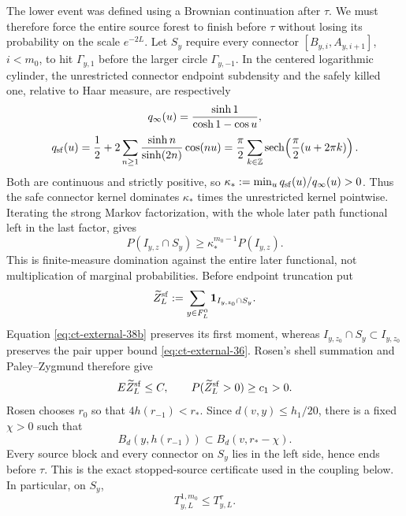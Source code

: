 The lower event was defined using a Brownian continuation after $\tau$.
We must therefore force the entire source forest to finish before $\tau$
without losing its probability on the scale $e^{-2L}$.  Let $S_y$ require every connector
$[B_{y,i},A_{y,i+1}]$, $i<m_0$, to hit $\Gamma_{y,1}$ before the
larger circle $\Gamma_{y,-1}$.  In the centered logarithmic cylinder,
the unrestricted connector endpoint subdensity and the safely killed
one, relative to Haar measure, are respectively
\[
q_\infty(u)={\sinh1\over\cosh1-\cos u},
\]
\begin{equation}
q_{\rm sf}(u)=\frac12+2\sum_{n\ge1}{\sinh n\over\sinh(2n)}\cos(nu)
 =\frac\pi2\sum_{k\in\mathbb Z}
       \operatorname {sech}\!\left({\pi\over2}(u+2\pi k)\right).\label{eq:ct-external-38a}
\end{equation}
Both are continuous and strictly positive, so
$\kappa_*:=\min_uq_{\rm sf}(u)/q_\infty(u)>0$.  Thus the safe
connector kernel dominates $\kappa_*$ times the unrestricted kernel
pointwise.  Iterating the strong Markov factorization, with the whole
later path functional left in the last factor, gives
\begin{equation}
P(I_{y,z}\cap S_y)\ge\kappa_*^{m_0-1}P(I_{y,z}).\label{eq:ct-external-38b}
\end{equation}
This is finite-measure domination against the entire later functional,
not multiplication of marginal probabilities.  Before endpoint
truncation put
\[
\widetilde Z_L^{\rm sf}:=\sum_{y\in F_L^0}{\bf1}_{I_{y,z_0}\cap S_y}.
\]
Equation \eqref{eq:ct-external-38b} preserves its first moment, whereas
$I_{y,z_0}\cap S_y\subset I_{y,z_0}$ preserves the pair upper bound
\eqref{eq:ct-external-36}.  Rosen's shell summation and Paley--Zygmund therefore give
\begin{equation}
E\widetilde Z_L^{\rm sf}\le C,\qquad
 P(\widetilde Z_L^{\rm sf}>0)\ge c_1>0.\label{eq:ct-external-38c}
\end{equation}
Rosen chooses $r_0$ so that $4h(r_{-1})<r_*$.  Since
$d(v,y)\le h_1/20$, there is a fixed $\chi>0$ such that
\begin{equation}
B_d(y,h(r_{-1}))\subset B_d(v,r_*-\chi).\label{eq:ct-external-38d}
\end{equation}
Every source block and every connector on $S_y$ lies in the left
side, hence ends before $\tau$.  This is the exact stopped-source
certificate used in the coupling below.  In particular, on $S_y$,
\begin{equation}
T_{y,L}^{1,m_0}\le T_{y,L}^{\tau}.\label{eq:ct-external-38e}
\end{equation}
